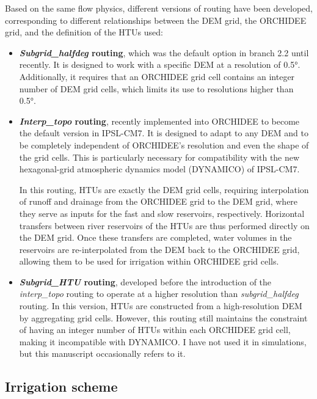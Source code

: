 Based on the same flow physics, different versions of routing have been developed, corresponding to different relationships between the DEM grid, the ORCHIDEE grid, and the definition of the HTUs used:

\begin{itemize}
\item \textbf{\textit{Subgrid\_halfdeg} routing}, which was the default option in branch 2.2 until recently. It is designed to work with a specific DEM at a resolution of 0.5°. Additionally, it requires that an ORCHIDEE grid cell contains an integer number of DEM grid cells, which limits its use to resolutions higher than 0.5°.

\item \textbf{\textit{Interp\_topo} routing}, recently implemented into ORCHIDEE to become the default version in IPSL-CM7. It is designed to adapt to any DEM and to be completely independent of ORCHIDEE’s resolution and even the shape of the grid cells. This is particularly necessary for compatibility with the new hexagonal-grid atmospheric dynamics model (DYNAMICO) of IPSL-CM7.

In this routing, HTUs are exactly the DEM grid cells, requiring interpolation of runoff and drainage from the ORCHIDEE grid to the DEM grid, where they serve as inputs for the fast and slow reservoirs, respectively. Horizontal transfers between river reservoirs of the HTUs are thus performed directly on the DEM grid. Once these transfers are completed, water volumes in the reservoirs are re-interpolated from the DEM back to the ORCHIDEE grid, allowing them to be used for irrigation within ORCHIDEE grid cells.

\item \textbf{\textit{Subgrid\_HTU} routing}, developed before the introduction of the \textit{interp\_topo} routing to operate at a higher resolution than \textit{subgrid\_halfdeg} routing. In this version, HTUs are constructed from a high-resolution DEM by aggregating grid cells. However, this routing still maintains the constraint of having an integer number of HTUs within each ORCHIDEE grid cell, making it incompatible with DYNAMICO. I have not used it in simulations, but this manuscript occasionally refers to it.
\end{itemize}

\subsection{Irrigation scheme}
